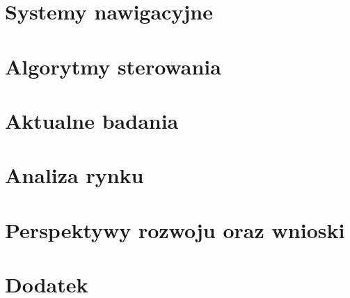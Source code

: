 \documentclass[12pt,twoside]{report} %
\begin{document}
\chapter{Systemy nawigacyjne}


\chapter{Algorytmy sterowania}


\chapter{Aktualne badania}


\chapter{Analiza rynku}


\chapter{Perspektywy rozwoju oraz wnioski}


%

\appendix
\chapter{Dodatek}


\listoffigures

\printbibliography[
heading=bibintoc
]
%
%
\end{document}
